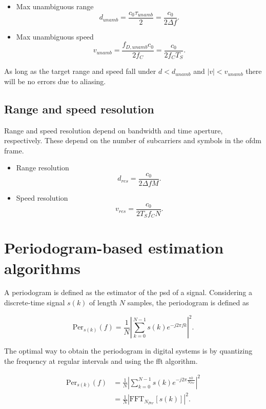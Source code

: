         \begin{itemize}
            \item Max unambiguous range
            $$ d_{unamb} = \frac{c_0 \tau_{unamb}}{2} = \frac{c_0}{2\Delta f}.$$
            \item Max unambiguous speed
            $$ v_{unamb} = \frac{f_{D,unamb} c_0}{2f_C} = \frac{c_0}{2f_C T_S}.$$
        \end{itemize}
        
        As long as the target range and speed fall under $d < d_{unamb}$ and $|v| < v_{unamb}$ there will be no errors due to aliasing.
        
    \subsection{Range and speed resolution}
    
        Range and speed resolution depend on bandwidth and time aperture, respectively. These depend on the number of subcarriers and symbols in the \gls{ofdm} frame.
        
        \begin{itemize}
            \item Range resolution
            $$ d_{res} =  \frac{c_0}{2\Delta f M}. $$
            \item Speed resolution
            $$ v_{res} = \frac{c_0}{2 T_S f_C N}. $$
        \end{itemize}
        

        
\section{Periodogram-based estimation algorithms}
    
    A periodogram is defined as the estimator of the \gls{psd} of a signal.
    Considering a discrete-time signal $s(k)$ of length $N$ samples, the periodogram is defined as
    
    \begin{equation}
        \text{Per}_{s(k)}(f) = \frac{1}{N}\left| \sum_{k=0}^{N-1} s(k)e^{-j2\pi fk}\right|^2.
    \end{equation}

    The optimal way to obtain the periodogram in digital systems is by quantizing the frequency at regular intervals and using the \gls{fft} algorithm.

    \begin{align}
        \text{Per}_{s(k)}(f) &= \frac{1}{N}\left| \sum_{k=0}^{N-1} s(k)e^{-j2\pi \frac{nk}{N_{Per}}}\right|^2 \\
        &= \frac{1}{N}\left| \text{FFT}_{N_{Per}}[s(k)]\right|^2.
    \end{align}
    
